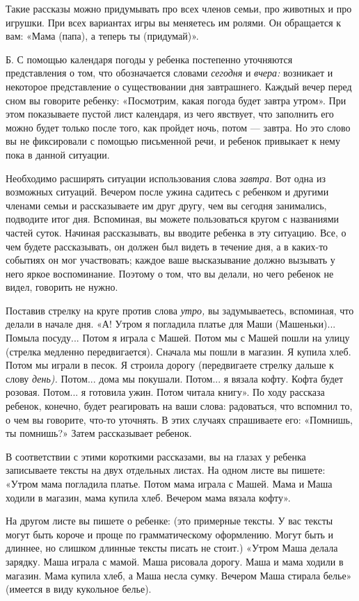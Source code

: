 \documentclass[a5paper]{book}
\renewcommand{\emph}[1]{\textit{#1}}
\begin{document}
Такие рассказы можно придумывать про всех членов семьи, про животных и
про игрушки. При всех вариантах игры вы меняетесь им ролями. Он
обращается к вам: «Мама (папа), а теперь ты (придумай)».

Б. С помощью календаря погоды у ребенка постепенно уточняются
представления о том, что обозначается словами \emph{сегодня} и
\emph{вчера:} возникает и некоторое представление о существовании дня
завтрашнего. Каждый вечер перед сном вы говорите ребенку: «Посмотрим,
какая погода будет завтра утром». При этом показываете пустой лист
календаря, из чего явствует, что заполнить его можно будет только после
того, как пройдет ночь, потом --- завтра. Но это слово вы не фиксировали
с помощью письменной речи, и ребенок привыкает к нему пока в данной
ситуации.

Необходимо расширять ситуации использования слова \emph{завтра.} Вот
одна из возможных ситуаций. Вечером после ужина садитесь с ребенком и
другими членами семьи и рассказываете им друг другу, чем вы сегодня
занимались, подводите итог дня. Вспоминая, вы можете пользоваться кругом
с названиями частей суток. Начиная рассказывать, вы вводите ребенка в
эту ситуацию. Все, о чем будете рассказывать, он должен был видеть в
течение дня, а в каких-то событиях он мог участвовать; каждое ваше
высказывание должно вызывать у него яркое воспоминание. Поэтому о том,
что вы делали, но чего ребенок не видел, говорить не нужно.

Поставив стрелку на круге против слова \emph{утро,} вы задумываетесь,
вспоминая, что делали в начале дня. «А! Утром я погладила платье для
Маши (Машеньки)... Помыла посуду... Потом я играла с Машей. Потом мы с
Машей пошли на улицу (стрелка медленно передвигается). Сначала мы пошли
в магазин. Я купила хлеб. Потом мы играли в песок. Я строила дорогу
(передвигаете стрелку дальше к слову \emph{день).} Потом... дома мы
покушали. Потом... я вязала кофту. Кофта будет розовая. Потом... я
готовила ужин. Потом читала книгу». По ходу рассказа ребенок, конечно,
будет реагировать на ваши слова: радоваться, что вспомнил то, о чем вы
говорите, что-то уточнять. В этих случаях спрашиваете его: «Помнишь, ты
помнишь?» Затем рассказывает ребенок.

В соответствии с этими короткими рассказами, вы на глазах у ребенка
записываете тексты на двух отдельных листах. На одном листе вы пишете:
«Утром мама погладила платье. Потом мама играла с Машей. Мама и Маша
ходили в магазин, мама купила хлеб. Вечером мама вязала кофту».

На другом листе вы пишете о ребенке: (это примерные тексты. У вас тексты
могут быть короче и проще по грамматическому оформлению. Могут быть и
длиннее, но слишком длинные тексты писать не стоит.) «Утром Маша делала
зарядку. Маша играла с мамой. Маша рисовала дорогу. Маша и мама ходили в
магазин. Мама купила хлеб, а Маша несла сумку. Вечером Маша стирала
белье» (имеется в виду кукольное белье).
\end{document}
